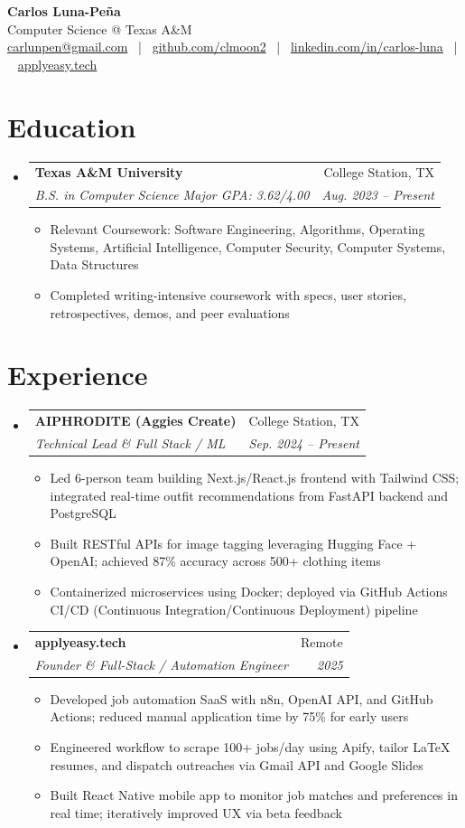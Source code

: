 \documentclass[letterpaper,11pt]{article}
\makeatletter
\newcommand{\resumeItem}[1]{
  \item\small{{#1 \vspace{-2pt}}}
}
\newcommand{\resumeSubheading}[4]{
  \vspace{-2pt}\item
    \begin{tabular*}{0.97\textwidth}[t]{l@{\extracolsep{\fill}}r}
      \textbf{#1} & #2 \\
      \textit{\small#3} & \textit{\small #4} \\
    \end{tabular*}\vspace{-7pt}
}
\newcommand{\resumeSubHeadingListStart}{\begin{itemize}[leftmargin=0.15in, label={}]}
\newcommand{\resumeSubHeadingListEnd}{\end{itemize}}
\newcommand{\resumeItemListStart}{\begin{itemize}}
\newcommand{\resumeItemListEnd}{\end{itemize}\vspace{-5pt}}
\makeatother
\begin{document}
\begin{center}
  {\Large \textbf{Carlos Luna-Pe\~na}} \\
  Computer Science @ Texas A\&M \\
  \href{mailto:carlunpen@gmail.com}{carlunpen@gmail.com} ~|~ \href{https://github.com/clmoon2}{github.com/clmoon2} ~|~ \href{https://linkedin.com/in/carlos-luna}{linkedin.com/in/carlos-luna} ~|~ \href{https://applyeasy.tech}{applyeasy.tech}
\end{center}

\section{Education}
\resumeSubHeadingListStart
\resumeSubheading
  {Texas A\&M University}{College Station, TX}
  {B.S. in Computer Science \textbullet{} Major GPA: 3.62/4.00}{Aug. 2023 -- Present}
  \resumeItemListStart
    \resumeItem{Relevant Coursework: Software Engineering, Algorithms, Operating Systems, Artificial Intelligence, Computer Security, Computer Systems, Data Structures}
    \resumeItem{Completed writing-intensive coursework with specs, user stories, retrospectives, demos, and peer evaluations}
  \resumeItemListEnd
\resumeSubHeadingListEnd

\section{Experience}
\resumeSubHeadingListStart
\resumeSubheading
  {AIPHRODITE (Aggies Create)}{College Station, TX}
  {Technical Lead \& Full Stack / ML}{Sep. 2024 -- Present}
  \resumeItemListStart
    \resumeItem{Led 6-person team building Next.js/React.js frontend with Tailwind CSS; integrated real-time outfit recommendations from FastAPI backend and PostgreSQL}
    \resumeItem{Built RESTful APIs for image tagging leveraging Hugging Face + OpenAI; achieved 87\% accuracy across 500+ clothing items}
    \resumeItem{Containerized microservices using Docker; deployed via GitHub Actions CI/CD (Continuous Integration/Continuous Deployment) pipeline}
  \resumeItemListEnd

\resumeSubheading
  {applyeasy.tech}{Remote}
  {Founder \& Full-Stack / Automation Engineer}{2025}
  \resumeItemListStart
    \resumeItem{Developed job automation SaaS with n8n, OpenAI API, and GitHub Actions; reduced manual application time by 75\% for early users}
    \resumeItem{Engineered workflow to scrape 100+ jobs/day using Apify, tailor LaTeX resumes, and dispatch outreaches via Gmail API and Google Slides}
    \resumeItem{Built React Native mobile app to monitor job matches and preferences in real time; iteratively improved UX via beta feedback}
  \resumeItemListEnd
\resumeSubHeadingListEnd
\end{document}
